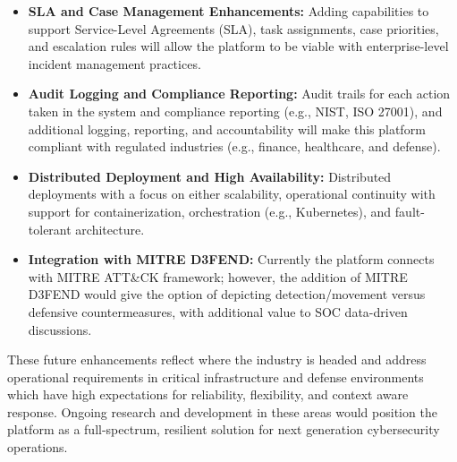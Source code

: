 \begin{itemize}
    \item \textbf{SLA and Case Management Enhancements:} Adding capabilities to support Service-Level Agreements (SLA), task assignments, case priorities, and escalation rules will allow the platform to be viable with enterprise-level incident management practices. 

    \item \textbf{Audit Logging and Compliance Reporting:}  Audit trails for each action taken in the system and compliance reporting (e.g., NIST, ISO 27001), and additional logging, reporting, and accountability will make this platform compliant with regulated industries (e.g., finance, healthcare, and defense). 

    \item \textbf{Distributed Deployment and High Availability:} Distributed deployments with a focus on either scalability, operational continuity with support for containerization, orchestration (e.g., Kubernetes), and fault-tolerant architecture.

    \item \textbf{Integration with MITRE D3FEND:} Currently the platform connects with MITRE ATT\&CK framework; however, the addition of MITRE D3FEND would give the option of depicting detection/movement versus defensive countermeasures, with additional value to SOC data-driven discussions.

\end{itemize}

These future enhancements reflect where the industry is headed and address operational requirements in critical infrastructure and defense environments which have high expectations for reliability, flexibility, and context aware response. Ongoing research and development in these areas would position the platform as a full-spectrum, resilient solution for next generation cybersecurity operations.
